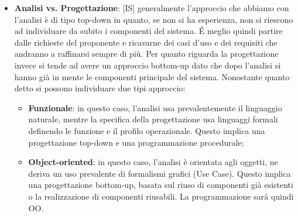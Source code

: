 \begin{itemize}
	\item \textbf{Analisi vs. Progettazione}: [IS] generalmente l'approccio che abbiamo con l'analisi è di tipo top-down in quanto, se non si ha esperienza, non si riescono ad individuare da subito i componenti del sistema. \'E meglio quindi partire dalle richieste del proponente e ricavarne dei casi d'uso e dei requisiti che andranno a raffinarsi sempre di più. \newline
	Per quanto riguarda la progettazione invece si tende ad avere un approccio bottom-up dato che dopo l'analisi si hanno già in mente le componenti principale del sistema. \newline
	Nonostante quanto detto si possono individuare due tipi approccio:
		\begin{itemize}
			\item \textbf{Funzionale}: in questo caso, l'analisi usa prevalentemente il linguaggio naturale, mentre la specifica della progettazione usa linguaggi formali definendo le funzione e il profilo operazionale. Questo implica una progettazione top-down e una programmazione procedurale;
			\item \textbf{Object-oriented}: in questo caso, l'analisi è orientata agli oggetti, ne deriva un uso prevalente di formalismi grafici (Use Case). Questo implica una progettazione bottom-up, basata sul riuso di componenti già esistenti o la realizzazione di componenti riusabili. La programmazione sarà quindi OO.
		\end{itemize}


\end{itemize}
